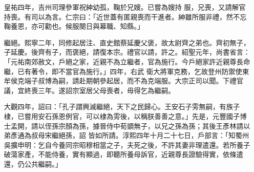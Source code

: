 \begin{pinyinscope}
 皇祐四年，吉州司理參軍祝紳幼孤，鞠於兄嫂。已嘗為嫂持
 服，兄喪，又請解官持喪。有司以為言。仁宗曰：「近世蓋有匿親喪而干進者。紳雖所服非禮，然不忘鞠養恩，亦可勸也。候服闋日與幕職、知縣。」



 繼絕。熙寧二年，同修起居注、直史館蔡延慶父褒，故太尉齊之弟也。齊初無子，子延慶。後齊有子，而褒絕，請復本宗。禮官以請，許之。紹聖元年，尚書省言：「元祐南郊赦文，戶絕之家，近親不為立繼者，官為施行。今戶絕家許近親尊長命繼，已有著令，即不當官為施行。」四年，右武
 衛大將軍克務，乞故登州防禦使東牟侯克端子叔博為嗣，請赴期朝參起居，而不為克端服。大宗正司以聞。下禮官議，宜終喪三年。遂詔宗室居父母喪者，毋得乞為繼嗣。



 大觀四年，詔曰：「孔子謂興滅繼絕，天下之民歸心。王安石子雱無嗣，有族子棣，已嘗用安石孫恩例官，可以棣為雱後，以稱朕善善之意。」先是，元豐國子博士孟開，請以侄孫宗顏為孫，據晉侍中荀顗無子，以兄之孫為孫；其後王彥林請以弟彥通為叔母宋繼絕孫，詔
 皆如所請。淳熙四年十月二十七日，戶部言：「知蜀州吳擴申明：乞自今養同宗昭穆相當之子，夫死之後，不許其妻非理遣還。若所養子破蕩家產，不能侍養，實有顯過，即聽所養母訴官，近親尊長證驗得實，依條遣還，仍公共繼嗣。」



\end{pinyinscope}
